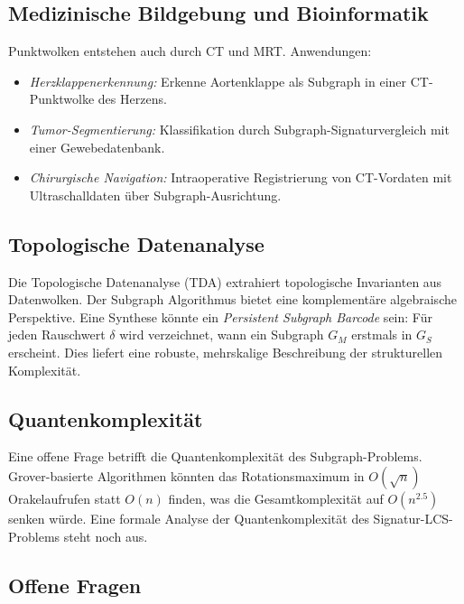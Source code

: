 ﻿\documentclass[a4paper,12pt]{article}
\theoremstyle{definition}
\begin{document}
\subsection{Medizinische Bildgebung und Bioinformatik}

Punktwolken entstehen auch durch CT und MRT. Anwendungen:

\begin{itemize}
  \item \emph{Herzklappenerkennung:} Erkenne Aortenklappe als
        Subgraph in einer CT-Punktwolke des Herzens.
  \item \emph{Tumor-Segmentierung:} Klassifikation durch
        Subgraph-Signaturvergleich mit einer Gewebedatenbank.
  \item \emph{Chirurgische Navigation:} Intraoperative Registrierung
        von CT-Vordaten mit Ultraschalldaten über Subgraph-Ausrichtung.
\end{itemize}

\subsection{Topologische Datenanalyse}

Die Topologische Datenanalyse (TDA) \citep{Carlsson2009} extrahiert
topologische Invarianten aus Datenwolken. Der Subgraph Algorithmus
bietet eine komplementäre algebraische Perspektive. Eine Synthese
könnte ein \emph{Persistent Subgraph Barcode} sein: Für jeden
Rauschwert $\delta$ wird verzeichnet, wann ein Subgraph $G_M$ erstmals
in $G_S$ erscheint. Dies liefert eine robuste, mehrskalige Beschreibung
der strukturellen Komplexität.

\subsection{Quantenkomplexität}

Eine offene Frage betrifft die Quantenkomplexität des
Subgraph-Problems. Grover-basierte Algorithmen \citep{Childs2010}
könnten das Rotationsmaximum in $O(\sqrt{n})$ Orakelaufrufen statt
$O(n)$ finden, was die Gesamtkomplexität auf $O(n^{2.5})$ senken würde.
Eine formale Analyse der Quantenkomplexität des
Signatur-LCS-Problems steht noch aus.

\subsection{Offene Fragen}
\end{document}
